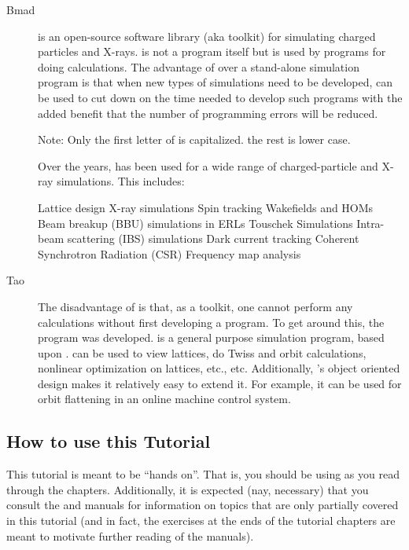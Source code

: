 \documentclass{hitec}     %
\begin{document}
\begin{description}
\item[Bmad] \Newline
\bmad is an open-source software library (aka toolkit) for simulating charged particles and
X-rays. \bmad is not a program itself but is used by programs for doing calculations. The advantage
of \bmad over a stand-alone simulation program is that when new types of simulations need to be
developed, \bmad can be used to cut down on the time needed to develop such programs with the added
benefit that the number of programming errors will be reduced.

Note: Only the first letter of \bmad is capitalized. the rest is lower case.

Over the years, \bmad has been used for a wide range of charged-particle and X-ray simulations. This
includes:
\begin{code}
Lattice design                                  X-ray simulations
Spin tracking                                   Wakefields and HOMs
Beam breakup (BBU) simulations in ERLs          Touschek Simulations
Intra-beam scattering (IBS) simulations         Dark current tracking
Coherent Synchrotron Radiation (CSR)            Frequency map analysis
\end{code}
%
\item[Tao] \Newline
The disadvantage of \bmad is that, as a toolkit, one cannot perform any calculations without first
developing a program. To get around this, the \tao program was developed.  \tao is a general purpose
simulation program, based upon \bmad. \tao can be used to view lattices, do Twiss and orbit
calculations, nonlinear optimization on lattices, etc., etc.  Additionally, \tao's object oriented
design makes it relatively easy to extend it. For example, it can be used for orbit flattening in an
online machine control system.
  \end{description}

\subsection{How to use this Tutorial}
\label{s:use.tutorial}

This tutorial is meant to be ``hands on''. That is, you should be using \tao as you read through the
chapters. Additionally, it is expected (nay, necessary) that you consult the \bmad and \tao manuals
for information on topics that are only partially covered in this tutorial (and in fact, the
exercises at the ends of the tutorial chapters are meant to motivate further reading of the
manuals).
\end{document}
